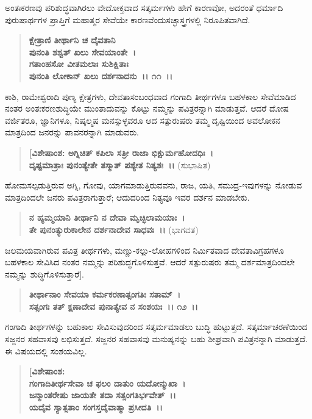 ಅಂತಃಕರಣವು ಪರಿಶುದ್ಧವಾಗಿರಲು ವೇದೋಕ್ತವಾದ ಸತ್ಕರ್ಮಗಳು ಹೇಗೆ ಕಾರಣವೋ, ಅದರಂತೆ ಧರ್ಮಾದಿ ಪುರುಷಾರ್ಥಗಳ ಪ್ರಾಪ್ತಿಗೆ ಮಹಾತ್ಮರ ಸೇವೆಯೇ ಕಾರಣವೆಂದು\break ಸಚ್ಛಾಸ್ತ್ರಗಳಲ್ಲಿ ನಿರೂಪಿತವಾಗಿದೆ.

\begin{verse}
\textbf{ಕ್ಷೇತ್ರಾಣಿ ತೀರ್ಥಾನಿ ಚ ದೈವತಾನಿ} \\\textbf{ಪುನಂತಿ ಶಶ್ವತ್ ಖಲು ಸೇವಯಾಂತೇ~।}\\\textbf{ಗತಾಂಹಸೋ ವೀತಮಲಾಃ ಸುಶಿಕ್ಷಿತಾಃ} \\\textbf{ಪುನಂತಿ ಲೋಕಾನ್ ಖಲು ದರ್ಶನಾದನು~।। ೧೧~।।}
\end{verse}

ಕಾಶಿ, ರಾಮೇಶ್ವರಾದಿ ಪುಣ್ಯ ಕ್ಷೇತ್ರಗಳು, ದೇವತಾಸಂಬಂಧವಾದ ಗಂಗಾದಿ ತೀರ್ಥಗಳೂ ಬಹಳಕಾಲ ಸೇವೆಮಾಡಿದ ನಂತರ ಅಂತಃಕರಣಶುದ್ಧಿಯೇ ಮುಂತಾದುವನ್ನು ಕೊಟ್ಟು ನಮ್ಮನ್ನು ಪವಿತ್ರರನ್ನಾಗಿ ಮಾಡುತ್ತವೆ. ಆದರೆ ದೋಷ ವರ್ಜಿತರೂ, ಜ್ಞಾನಿಗಳೂ, ನಿಷ್ಕಲ್ಮಷ ಮನಸ್ಸುಳ್ಳವರೂ ಆದ ಸತ್ಪುರುಷರು ತಮ್ಮ ದೃಷ್ಟಿಯಿಂದ ಅವಲೋಕನ ಮಾತ್ರದಿಂದ ಜನರನ್ನು ಪಾವನರನ್ನಾಗಿ ಮಾಡುವರು.

\begin{verse}
\textbf{[ವಿಶೇಷಾಂಶ: ಅಗ್ನಿಚಿತ್ ಕಪಿಲಾ ಸತ್ರೀ ರಾಜಾ ಭಿಕ್ಷುರ್ಮಹೋದಧಿಃ~।}\\\textbf{ದೃಷ್ಟಮಾತ್ರಾಃ ಪುನಂತ್ಯೇತೇ ತಸ್ಮಾತ್ ಪಶ್ಯೇತ ನಿತ್ಯಶಃ~।।} (ಸುಭಾಷಿತ)
\end{verse}

ಹೋಮಸಲ್ಪಡುತ್ತಿರುವ ಅಗ್ನಿ, ಗೋವು, ಯಾಗಮಾಡುತ್ತಿರುವವನು, ರಾಜ, ಯತಿ, ಸಮುದ್ರ-ಇವುಗಳನ್ನು ನೋಡುವ ಮಾತ್ರದಿಂದಲೇ ಜನರು ಪವಿತ್ರರಾಗುತ್ತಾರೆ; ಆದುದರಿಂದ ನಿತ್ಯವೂ ಇವರ ದರ್ಶನ ಮಾಡಬೇಕು.

\begin{verse}
\textbf{ನ ಹ್ಯಮ್ಮಯಾನಿ ತೀರ್ಥಾನಿ ನ ದೇವಾ ಮೃಚ್ಛಿಲಾಮಯಾಃ~।}\\\textbf{ತೇ ಪುನಂತ್ಯುರುಕಾಲೇನ ದರ್ಶನಾದೇವ ಸಾಧವಃ~।।} (ಭಾಗವತ)
\end{verse}

ಜಲಮಯವಾಗಿರುವ ಪವಿತ್ರ ತೀರ್ಥಗಳು, ಮಣ್ಣು-ಕಲ್ಲು-ಲೋಹಗಳಿಂದ ನಿರ್ಮಿತವಾದ ದೇವತಾವಿಗ್ರಹಗಳೂ ಬಹಳಕಾಲ ಸೇವಿಸಿದ ನಂತರ ನಮ್ಮನ್ನು ಪರಿಶುದ್ಧಗೊಳಿಸುತ್ತವೆ. ಆದರೆ ಸತ್ಪುರುಷರು ತಮ್ಮ ದರ್ಶಮಾತ್ರದಿಂದಲೇ ನಮ್ಮನ್ನು ಶುದ್ಧಿಗೊಳಿಸುತ್ತಾರೆ].

\begin{verse}
\textbf{ತೀರ್ಥಾನಾಂ ಸೇವಯಾ ಕರ್ಮಕರಣಾತ್ಸಂಗತಿಃ ಸತಾಮ್~।}\\\textbf{ಸತ್ಸಂಗಃ ತತ್ ಕ್ಷಣಾದೇವ ಪುನಾತ್ಯೇವ ನ ಸಂಶಯಃ~।। ೧೨~।।}
\end{verse}

ಗಂಗಾದಿ ತೀರ್ಥಗಳನ್ನು ಬಹುಕಾಲ ಸೇವಿಸುವುದರಿಂದ ಸತ್ಕರ್ಮಮಾಡಲು ಬುದ್ಧಿ ಹುಟ್ಟುತ್ತದೆ. ಸತ್ಕರ್ಮಾಚರಣೆಯಿಂದ ಸಜ್ಜನರ ಸಹವಾಸವು ಲಭಿಸುತ್ತದೆ. ಸಜ್ಜನರ ಸಹವಾಸವು ಮನುಷ್ಯನನ್ನು ಬಹು ಶೀಘ್ರವಾಗಿ ಪವಿತ್ರನನ್ನಾಗಿ ಮಾಡುತ್ತದೆ. ಈ ವಿಷಯದಲ್ಲಿ ಸಂಶಯವಿಲ್ಲ.

\begin{verse}
\textbf{[ವಿಶೇಷಾಂಶ:}\\\textbf{ಗಂಗಾದಿತೀರ್ಥಸೇವಾ ಚ ಫಲಂ ದಾತುಂ ಯದೋನ್ಮುಖಾ~।}\\\textbf{ಜನ್ಮಾಂತರೇಷು ಜಾಯತೇ ತದಾ ಸತ್ಸಂಗತಿರ್ಭವೇತ್~।।}\\\textbf{ಯದೈವ ಸ್ಯಾತ್ಸತಾಂ ಸಂಗಸ್ತದೈವಾತ್ಮಾ ಪ್ರಸೀದತಿ~।।}  
\end{verse}

